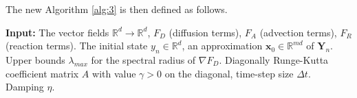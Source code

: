 \documentclass[10pt,a4paper]{article}
\begin{document}
The new Algorithm \ref{alg:3} is then defined as follows.
\begin{algorithm} 
\caption{{New} Runge-Kutta Chebyshev implementation of diagonally implicit Runge-Kutta methods \label{alg:3} }


\textbf{Input:}
The vector fields $\mathbb{R}^d\rightarrow\mathbb{R}^d$, $F_D$ (diffusion terms), $F_A$ (advection terms), $F_R$ (reaction terms).
The initial state $y_{n}\in\mathbb{R}^d$, an approximation ${\boldsymbol{x}}_0\in\mathbb{R}^{md}$ of ${\boldsymbol{Y}}_{n}$. Upper bounds $\lambda_{max}$ for the spectral radius of $\nabla F_D$.  
Diagonally Runge-Kutta coefficient matrix $A$ with value $\gamma>0$ on the diagonal, time-step size $\Delta t$. Damping $\eta$. 

\vspace{0.1cm}



\end{algorithm}
\end{document}
